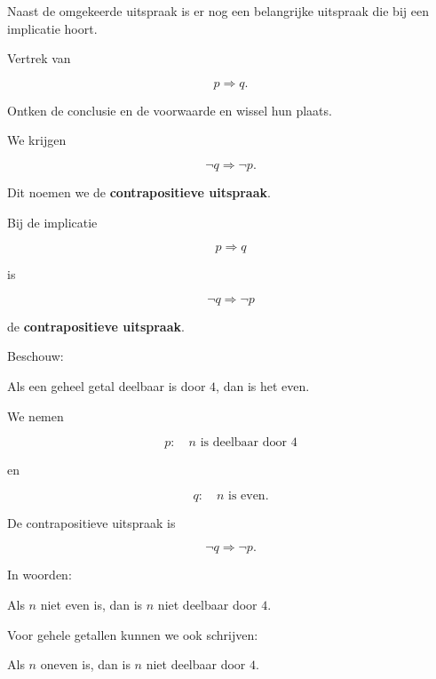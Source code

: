 \documentclass{ximera}
\begin{document}

Naast de omgekeerde uitspraak is er nog een belangrijke uitspraak die
bij een implicatie hoort.

Vertrek van

\[
p\Rightarrow q.
\]

Ontken de conclusie en de voorwaarde en wissel hun plaats.

We krijgen

\[
\neg q\Rightarrow\neg p.
\]

Dit noemen we de \textbf{contrapositieve uitspraak}.


\begin{definitie}

Bij de implicatie

\[
p\Rightarrow q
\]

is

\[
\neg q\Rightarrow\neg p
\]

de \textbf{contrapositieve uitspraak}.

\end{definitie}


\begin{voorbeeld}

Beschouw:

\begin{center}
Als een geheel getal deelbaar is door $4$, dan is het even.
\end{center}

We nemen

\[
p:\quad n\text{ is deelbaar door }4
\]

en

\[
q:\quad n\text{ is even}.
\]

De contrapositieve uitspraak is

\[
\neg q\Rightarrow\neg p.
\]

In woorden:

\begin{center}
Als $n$ niet even is, dan is $n$ niet deelbaar door $4$.
\end{center}

Voor gehele getallen kunnen we ook schrijven:

\begin{center}
Als $n$ oneven is, dan is $n$ niet deelbaar door $4$.
\end{center}

\end{voorbeeld}
\end{document}
